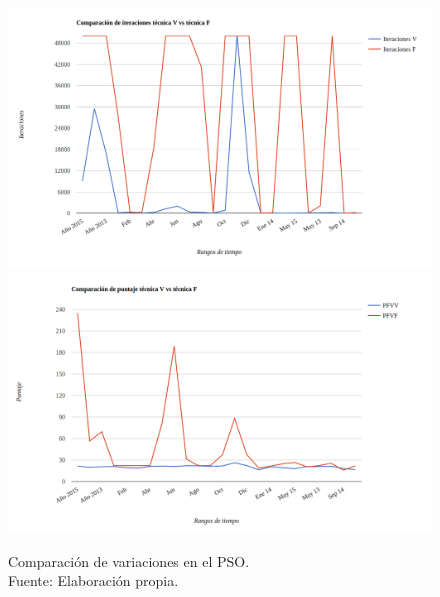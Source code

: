 \begin{figure}[ht!]
    \centering
    \captionsetup{justification=centering,margin=2cm}
        \includegraphics[width=\textwidth]{figures/comp_v1_v2_iteraciones.png}
        \includegraphics[width=\textwidth]{figures/comp_v1_v2_puntaje.png} 
    \caption{Comparación de variaciones en el PSO.\\ Fuente: Elaboración propia.}
    \label{fig:comparison_pso_1}
\end{figure}


